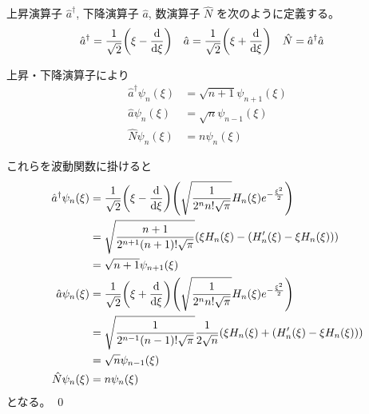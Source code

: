 \documentclass[uplatex,dvipdfmx,a4paper,11pt]{jlreq}
\makeatletter
\theoremstyle{definition}
\renewenvironment{proof}[1][\proofname]{\par
  \normalfont
  \topsep6\p@\@plus6\p@ \trivlist
  \item[\hskip\labelsep{\bfseries #1}\@addpunct{\bfseries}]\ignorespaces\quad\par
}{%
  \qed\endtrivlist\@endpefalse
}
\renewcommand\proofname{証明}
\makeatother
\begin{document}
\begin{definition}
  上昇演算子 $\hat{a}^\dagger$, 下降演算子 $\hat{a}$, 数演算子 $\hat{N}$ を次のように定義する。
  \begin{align}
    \hat{a}^\dagger & = \frac{1}{\sqrt{2}}\qty(\xi - \dv{\xi}) & \hat{a} & = \frac{1}{\sqrt{2}}\qty(\xi + \dv{\xi}) & \hat{N} & = \hat{a}^\dagger\hat{a}
  \end{align}
\end{definition}

\begin{proposition}
  上昇・下降演算子により
  \begin{align}
    \hat{a}^\dagger\psi_n(\xi) & = \sqrt{n+1}\psi_{n+1}(\xi) \\
    \hat{a}\psi_n(\xi)         & = \sqrt{n}\psi_{n-1}(\xi)   \\
    \hat{N}\psi_n(\xi)         & = n\psi_n(\xi)
  \end{align}
\end{proposition}
\begin{proof}
  これらを波動関数に掛けると
  \begin{align}
    \hat{a}^\dagger\psi_n(\xi) & = \frac{1}{\sqrt{2}}\qty(\xi - \dv{\xi})\qty(\sqrt{\frac{1}{2^nn!\sqrt{\pi}}}H_n(\xi)e^{-\frac{\xi^2}{2}})   \\
                               & = \sqrt{\frac{n+1}{2^{n+1}(n+1)!\sqrt{\pi}}}\qty(\xi H_n(\xi) - (H_n'(\xi) - \xi H_n(\xi)))                  \\
                               & = \sqrt{n+1}\psi_{n+1}(\xi)                                                                                  \\
    \hat{a}\psi_n(\xi)         & = \frac{1}{\sqrt{2}}\qty(\xi + \dv{\xi})\qty(\sqrt{\frac{1}{2^nn!\sqrt{\pi}}}H_n(\xi)e^{-\frac{\xi^2}{2}})   \\
                               & = \sqrt{\frac{1}{2^{n-1}(n-1)!\sqrt{\pi}}}\frac{1}{2\sqrt{n}}\qty(\xi H_n(\xi) + (H_n'(\xi) - \xi H_n(\xi))) \\
                               & = \sqrt{n}\psi_{n-1}(\xi)                                                                                    \\
    \hat{N}\psi_n(\xi)         & = n\psi_n(\xi)
  \end{align}
  となる。
\end{proof}
\end{document}
